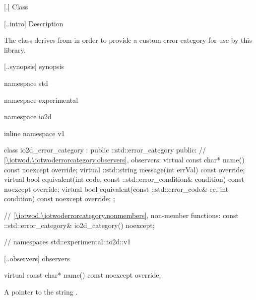  [\iotwod.\iotwoderrorcategory] {Class }

 [\iotwod.\iotwoderrorcategory.intro] { 
Description}

\pnum
{}%
The  class derives from 
 in order to provide a custom error category for 
use by this library.

 [\iotwod.\iotwoderrorcategory.synopsis] { 
synopsis}

\begin{codeblock}
namespace std { namespace experimental { namespace io2d { inline namespace v1 {
  class io2d_error_category : public ::std::error_category {
  public:
    // \ref{\iotwod.\iotwoderrorcategory.observers}, observers:
    virtual const char* name() const noexcept override;
    virtual ::std::string message(int errVal) const override;
    virtual bool equivalent(int code,
      const ::std::error_condition& condition) const noexcept override;
    virtual bool equivalent(const ::std::error_code& ec,
      int condition) const noexcept override;
  };
  
  // \ref{\iotwod.\iotwoderrorcategory.nonmembers}, non-member functions:
  const ::std::error_category& io2d_category() noexcept;
} } } } // namespaces std::experimental::io2d::v1
\end{codeblock}

 [\iotwod.\iotwoderrorcategory.observers] { 
observers}

%
%
\begin{itemdecl}
virtual const char* name() const noexcept override;
\end{itemdecl}
\begin{itemdescr}
	\pnum
	\returns
	A pointer to the string .
\end{itemdescr}

